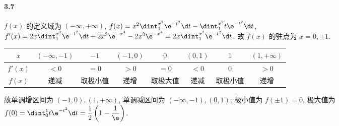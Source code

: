 \paragraph*{3.7} $f(x)$ 的定义域为 $(-\infty, +\infty)$, $f(x)=x^2\dint_{1}^{x^2} \e^{-t^2} \d t - \dint_{1}^{x^2} t\e^{-t^2} \d t$, $f'(x)=2x\dint_{1}^{x^2}\e^{-t^2}\d t+2x^3\e^{-x^4}-2x^3\e^{-x^4}=2x\dint_1^{x^2}\e^{-t^2}\d t$. 故 $f(x)$ 的驻点为 $x=0,\pm 1$.

\begin{tabular}{c|c|c|c|c|c|c|c}
\hline
$x$     & $(-\infty,-1)$ & $-1$ & $(-1,0)$ & $0$  & $(0,1)$ & $1$  & $(1,+\infty)$ \\ \hline
$f'(x)$ & $<0$           & $=0$ & $>0$     & $=0$ & $<0$    & $0$  & $>0$          \\ \hline
$f(x)$  & 递减             & 取极小值 & 递增       & 取极大值 & 递减      & 取极小值 & 递增            \\ \hline
\end{tabular}

故单调增区间为 $(-1,0),(1,+\infty)$, 单调减区间为 $(-\infty, -1), (0, 1)$; 极小值为 $f(\pm 1)=0$, 极大值为 $f(0)=\dint_{0}^{1}t\e^{-t^2}\d t=\dfrac{1}{2}\left(1-\dfrac{1}{\e}\right)$.